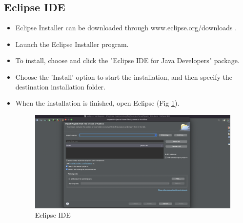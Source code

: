 \documentclass[10pt]{article}
\begin{document}
\subsection{Eclipse IDE}
\begin{itemize}
    \item Eclipse Installer can be downloaded through www.eclipse.org/downloads \cite{5}.
\item Launch the Eclipse Installer program.
\item To install, choose and click the "Eclipse IDE for Java Developers" package.
\item Choose the 'Install' option to start the installation, and then specify the destination installation folder.
\item When the installation is finished, open Eclipse (Fig \ref{fig:eclipse}). 
\begin{figure}[H]
    \begin{center}
        \includegraphics[width=0.7\linewidth, frame]{CA2-template/CM7.png}
       \caption{Eclipse IDE \label{fig:eclipse}}
    \end{center}
\end{figure}
\end{itemize}
\end{document}
